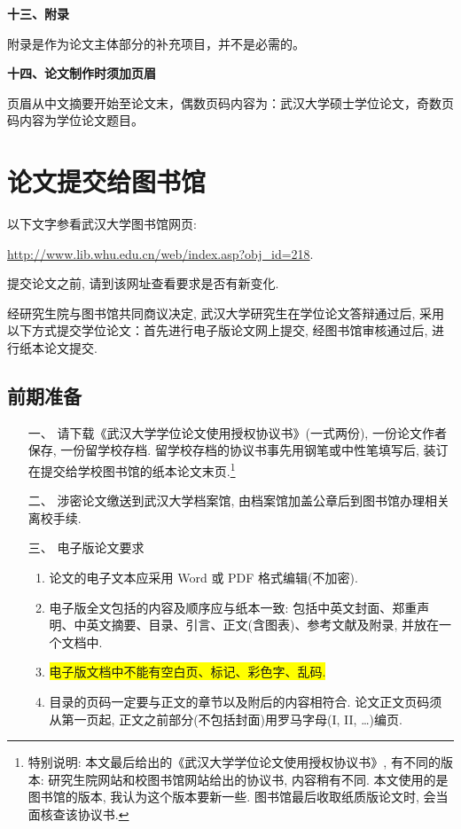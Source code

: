 \documentclass{WHUMaster}   %
\begin{document}
\textbf{十三、附录}

附录是作为论文主体部分的补充项目，并不是必需的。



\textbf{十四、论文制作时须加页眉}


页眉从中文摘要开始至论文末，偶数页码内容为：武汉大学硕士学位论文，奇数页码内容为学位论文题目。



\chapter{论文提交给图书馆}


{\kaishu 以下文字参看武汉大学图书馆网页:
 \begin{center}
 \url{http://www.lib.whu.edu.cn/web/index.asp?obj_id=218}.
 \end{center}
 提交论文之前, 请到该网址查看要求是否有新变化.}

 \bigskip

		经研究生院与图书馆共同商议决定, 武汉大学研究生在学位论文答辩通过后,
		采用以下方式提交学位论文：首先进行电子版论文网上提交, 经图书馆审核通过后, 进行纸本论文提交.

\section*{前期准备}
\begin{itemize}
	\item[一、] 请下载《武汉大学学位论文使用授权协议书》(一式两份), 一份论文作者保存, 一份留学校存档.
		留学校存档的协议书事先用钢笔或中性笔填写后,  装订在提交给学校图书馆的纸本论文末页.\footnote{\heiti 特别说明:
		本文最后给出的《武汉大学学位论文使用授权协议书》, 有不同的版本: 研究生院网站和校图书馆网站给出的协议书, 内容稍有不同.
		本文使用的是图书馆的版本, 我认为这个版本要新一些. 图书馆最后收取纸质版论文时, 会当面核查该协议书.}

		\item[二、]涉密论文缴送到武汉大学档案馆, 由档案馆加盖公章后到图书馆办理相关离校手续.

		\item[三、]电子版论文要求
\begin{enumerate}[1.]
	\item 论文的电子文本应采用 Word 或 PDF 格式编辑(不加密).
	\item 电子版全文包括的内容及顺序应与纸本一致: 包括中英文封面、郑重声明、中英文摘要、目录、引言、正文(含图表)、参考文献及附录, 并放在一个文档中.
	\item \colorbox{yellow}{电子版文档中不能有空白页、标记、彩色字、乱码.}
	\item 目录的页码一定要与正文的章节以及附后的内容相符合. 论文正文页码须从第一页起, 正文之前部分(不包括封面)用罗马字母(I, II, \dots)编页.
\end{enumerate}
\end{itemize}
\end{document}
